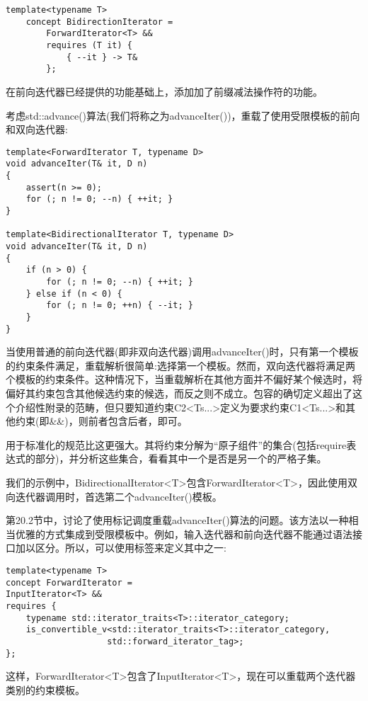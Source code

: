 \begin{lstlisting}[style=styleCXX]
template<typename T>
	concept BidirectionIterator =
		ForwardIterator<T> &&
		requires (T it) {
			{ --it } -> T&
		};
\end{lstlisting}

在前向迭代器已经提供的功能基础上，添加加了前缀减法操作符的功能。

考虑std::advance()算法(我们将称之为advanceIter())，重载了使用受限模板的前向和双向迭代器:

\begin{lstlisting}[style=styleCXX]
template<ForwardIterator T, typename D>
void advanceIter(T& it, D n)
{
	assert(n >= 0);
	for (; n != 0; --n) { ++it; }
}

template<BidirectionalIterator T, typename D>
void advanceIter(T& it, D n)
{
	if (n > 0) {
		for (; n != 0; --n) { ++it; }
	} else if (n < 0) {
		for (; n != 0; ++n) { --it; }
	}
}
\end{lstlisting}

当使用普通的前向迭代器(即非双向迭代器)调用advanceIter()时，只有第一个模板的约束条件满足，重载解析很简单:选择第一个模板。然而，双向迭代器将满足两个模板的约束条件。这种情况下，当重载解析在其他方面并不偏好某个候选时，将偏好其约束包含其他候选约束的候选，而反之则不成立。包容的确切定义超出了这个介绍性附录的范畴，但只要知道约束C2<Ts...>定义为要求约束C1<Ts...>和其他约束(即\&\&)，则前者包含后者，即可。

\begin{tcolorbox}[colback=webgreen!5!white,colframe=webgreen!75!black]
\hspace*{0.75cm}用于标准化的规范比这更强大。其将约束分解为“原子组件”的集合(包括require表达式的部分)，并分析这些集合，看看其中一个是否是另一个的严格子集。
\end{tcolorbox}

我们的示例中，BidirectionalIterator<T>包含ForwardIterator<T>，因此使用双向迭代器调用时，首选第二个advanceIter()模板。


第20.2节中，讨论了使用标记调度重载advanceIter()算法的问题。该方法以一种相当优雅的方式集成到受限模板中。例如，输入迭代器和前向迭代器不能通过语法接口加以区分。所以，可以使用标签来定义其中之一:

\begin{lstlisting}[style=styleCXX]
template<typename T>
concept ForwardIterator =
InputIterator<T> &&
requires {
	typename std::iterator_traits<T>::iterator_category;
	is_convertible_v<std::iterator_traits<T>::iterator_category,
					std::forward_iterator_tag>;
};
\end{lstlisting}

这样，ForwardIterator<T>包含了InputIterator<T>，现在可以重载两个迭代器类别的约束模板。





















